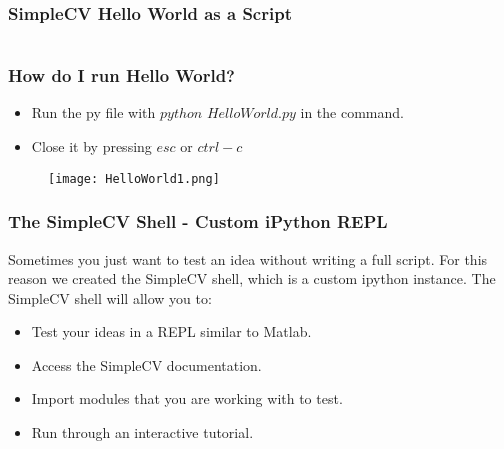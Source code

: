 \documentclass[compress]{beamer}
\begin{document}
\begin{frame}[fragile] %
\frametitle{SimpleCV Hello World as a Script}
\begin{example}[HelloWorld.py]
 \inputminted[linenos=true, tabsize=4,
 fontsize=\small]{python}{HelloWorld.py}
\end{example}
\end{frame}
\begin{frame}
\frametitle{How do I run Hello World?}
\begin{itemize}
\item Run the py file with $python$ $HelloWorld.py$ in the command.
\item Close it by pressing $esc$ or $ctrl-c$
\end{itemize}
\begin{figure}
  \texttt{[image: HelloWorld1.png]}
\end{figure}
\end{frame}

\begin{frame}
\frametitle{The SimpleCV Shell - Custom iPython REPL}
Sometimes you just want to test an idea without writing a full
script. For this reason we created the SimpleCV shell, which is a
custom ipython instance. The SimpleCV shell will allow you to:
\begin{itemize}
\item Test your ideas in a REPL similar to Matlab.
\item Access the SimpleCV documentation. 
\item Import modules that you are working with to test.
\item Run through an interactive tutorial. 
\end{itemize}
\end{frame}

\end{document}
